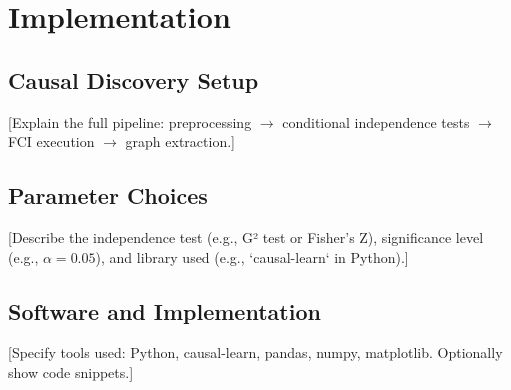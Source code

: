 \section{Implementation}

\subsection{Causal Discovery Setup}
[Explain the full pipeline: preprocessing $\rightarrow$ conditional independence tests $\rightarrow$ FCI execution $\rightarrow$ graph extraction.]

\subsection{Parameter Choices}
[Describe the independence test (e.g., G² test or Fisher's Z), significance level (e.g., $\alpha = 0.05$), and library used (e.g., `causal-learn` in Python).]

\subsection{Software and Implementation}
[Specify tools used: Python, causal-learn, pandas, numpy, matplotlib. Optionally show code snippets.]
